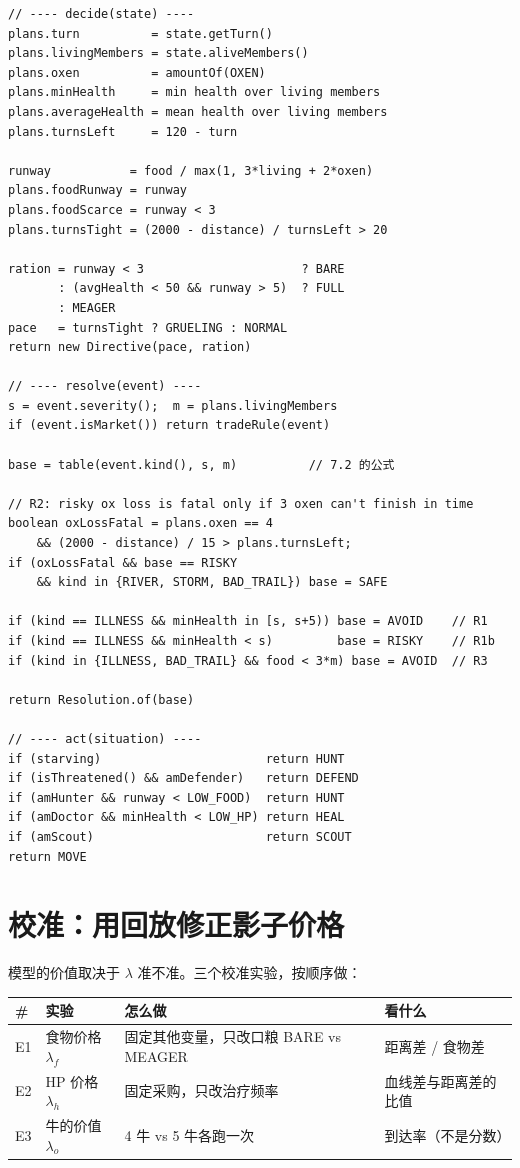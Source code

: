 \documentclass[UTF8,11pt,a4paper]{ctexart}
\begin{document}
\begin{verbatim}
// ---- decide(state) ----
plans.turn          = state.getTurn()
plans.livingMembers = state.aliveMembers()
plans.oxen          = amountOf(OXEN)
plans.minHealth     = min health over living members
plans.averageHealth = mean health over living members
plans.turnsLeft     = 120 - turn

runway           = food / max(1, 3*living + 2*oxen)
plans.foodRunway = runway
plans.foodScarce = runway < 3
plans.turnsTight = (2000 - distance) / turnsLeft > 20

ration = runway < 3                      ? BARE
       : (avgHealth < 50 && runway > 5)  ? FULL
       : MEAGER
pace   = turnsTight ? GRUELING : NORMAL
return new Directive(pace, ration)

// ---- resolve(event) ----
s = event.severity();  m = plans.livingMembers
if (event.isMarket()) return tradeRule(event)

base = table(event.kind(), s, m)          // 7.2 的公式

// R2: risky ox loss is fatal only if 3 oxen can't finish in time
boolean oxLossFatal = plans.oxen == 4
    && (2000 - distance) / 15 > plans.turnsLeft;
if (oxLossFatal && base == RISKY
    && kind in {RIVER, STORM, BAD_TRAIL}) base = SAFE

if (kind == ILLNESS && minHealth in [s, s+5)) base = AVOID    // R1
if (kind == ILLNESS && minHealth < s)         base = RISKY    // R1b
if (kind in {ILLNESS, BAD_TRAIL} && food < 3*m) base = AVOID  // R3

return Resolution.of(base)

// ---- act(situation) ----
if (starving)                       return HUNT
if (isThreatened() && amDefender)   return DEFEND
if (amHunter && runway < LOW_FOOD)  return HUNT
if (amDoctor && minHealth < LOW_HP) return HEAL
if (amScout)                        return SCOUT
return MOVE
\end{verbatim}

\section{校准：用回放修正影子价格}

模型的价值取决于 $\lambda$ 准不准。三个校准实验，按顺序做：

\begin{center}
\small
\begin{longtable}{@{}p{0.8cm}p{4.4cm}p{4.6cm}p{4.6cm}@{}}
\toprule
\textbf{\#} & \textbf{实验} & \textbf{怎么做} & \textbf{看什么} \\
\midrule
\endhead
E1 & 食物价格 $\lambda_f$ & 固定其他变量，只改口粮 BARE vs MEAGER & 距离差 / 食物差 \\
E2 & HP 价格 $\lambda_h$ & 固定采购，只改治疗频率 & 血线差与距离差的比值 \\
E3 & 牛的价值 $\lambda_o$ & 4 牛 vs 5 牛各跑一次 & 到达率（不是分数） \\
\bottomrule
\end{longtable}
\end{center}
\end{document}
